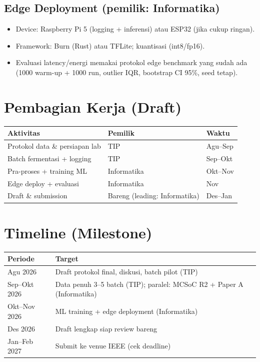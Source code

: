 \documentclass[conference]{IEEEtran}
\begin{document}
\subsection{Edge Deployment (pemilik: Informatika)}
\begin{itemize}
    \item Device: Raspberry Pi 5 (logging + inferensi) atau ESP32 (jika cukup ringan).
    \item Framework: Burn (Rust) atau TFLite; kuantisasi (int8/fp16).
    \item Evaluasi latency/energi memakai protokol edge benchmark yang sudah ada (1000 warm-up + 1000 run, outlier IQR, bootstrap CI 95\%, seed tetap).
\end{itemize}

\section{Pembagian Kerja (Draft)}
\begin{table}[h]
\centering
\begin{tabular}{@{}lll@{}}
\toprule
\textbf{Aktivitas} & \textbf{Pemilik} & \textbf{Waktu} \\
\midrule
Protokol data \& persiapan lab & TIP & Agu--Sep \\
Batch fermentasi + logging & TIP & Sep--Okt \\
Pra-proses + training ML & Informatika & Okt--Nov \\
Edge deploy + evaluasi & Informatika & Nov \\
Draft \& submission & Bareng (leading: Informatika) & Des--Jan \\
\bottomrule
\end{tabular}
\end{table}

\section{Timeline (Milestone)}
\begin{table}[h]
\centering
\begin{tabular}{@{}ll@{}}
\toprule
\textbf{Periode} & \textbf{Target} \\
\midrule
Agu 2026 & Draft protokol final, diskusi, batch pilot (TIP) \\
Sep--Okt 2026 & Data penuh 3--5 batch (TIP); paralel: MCSoC R2 + Paper A (Informatika) \\
Okt--Nov 2026 & ML training + edge deployment (Informatika) \\
Des 2026 & Draft lengkap siap review bareng \\
Jan--Feb 2027 & Submit ke venue IEEE (cek deadline) \\
\bottomrule
\end{tabular}
\end{table}
\end{document}
